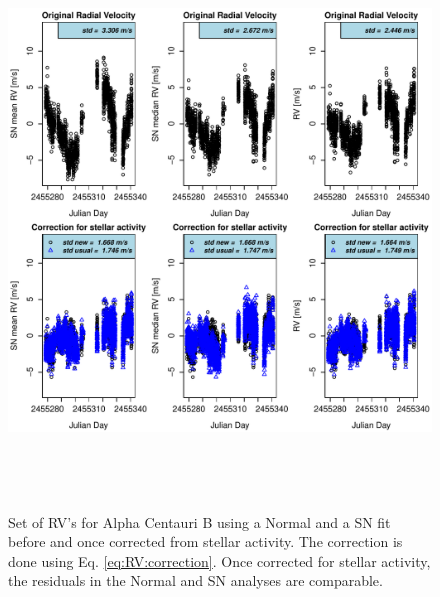 \documentclass{aa}
\begin{document}
\begin{figure} 
   \centering
\includegraphics[height = 6in]{NEW_CORRECTIONHD12862_[3]CorrectionActivity_RadialVelocity_vs_time.pdf} 
   \caption{Set of RV's for Alpha Centauri B using a Normal and a SN fit before and once corrected from stellar activity. The correction is done using Eq. \ref{eq:RV:correction}. Once corrected for stellar activity, the residuals in the Normal and SN analyses are comparable.}
   \label{fig:alphacent:correctionRV}
\end{figure}
\end{document}
